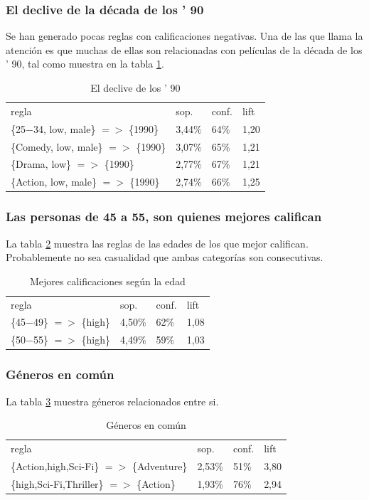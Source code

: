 \documentclass[journal]{IEEEtran}
\begin{document}
\subsubsection{El declive de la década de los ' 90}
Se han generado pocas reglas con calificaciones negativas. Una de las
que llama la atención es que muchas de ellas son relacionadas con películas
de la década de los ' 90, tal como muestra en la tabla \ref{table_year_90}.
\begin{table}[ht!]
\caption{El declive de los ' 90}
\label{table_year_90}
\centering
\begin{tabular}{l l l l }
regla & sop. & conf. & lift \\
\{25$-$34, low, male\} $=$$>$ \{1990\} & 3,44\% & 64\% & 1,20 \\
\{Comedy, low, male\} $=$$>$ \{1990\} & 3,07\% & 65\% & 1,21 \\
\{Drama, low\} $=$$>$ \{1990\} & 2,77\% & 67\% & 1,21 \\
\{Action, low, male\} $=$$>$ \{1990\} & 2,74\% & 66\% & 1,25 
\end{tabular}
\end{table}

\subsubsection{Las personas de 45 a 55, son quienes mejores califican}
La tabla \ref{table_age} muestra las reglas de las edades de los que
mejor califican. Probablemente no sea casualidad que ambas categorías 
son consecutivas.
\begin{table}[ht!]
\caption{Mejores calificaciones según la edad}
\label{table_age}
\centering
\begin{tabular}{l l l l }
regla & sop. & conf. & lift \\
\{45$-$49\} $=$$>$ \{high\} & 4,50\% & 62\% & 1,08 \\
\{50$-$55\} $=$$>$ \{high\} & 4,49\% & 59\% & 1,03 \\
\end{tabular}
\end{table}

\subsubsection{Géneros en común}
La tabla \ref{table_common_genre} muestra géneros relacionados 
entre si. 
\begin{table}[ht!]
\caption{Géneros en común}
\label{table_common_genre}
\centering
\begin{tabular}{l l l l }
regla & sop. & conf. & lift \\
\{Action,high,Sci-Fi\} $=$$>$ \{Adventure\} & 2,53\% & 51\% & 3,80 \\
\{high,Sci-Fi,Thriller\} $=$$>$ \{Action\} & 1,93\% & 76\% & 2,94 
\end{tabular}
\end{table}
\end{document}
